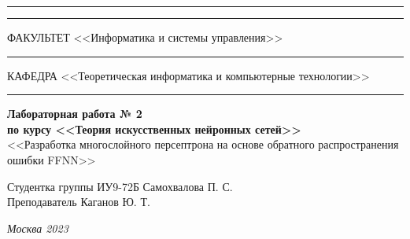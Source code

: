 \documentclass[a4paper, 14pt]{extarticle}
\begin{document}
\begin{titlepage}
\vspace{-25pt}
\hspace{-35pt}\rule{\textwidth}{2.3pt}

\vspace*{-20.3pt}
\hspace{-35pt}\rule{\textwidth}{0.4pt}

\vspace{1.5ex}
\hspace{-35pt} \noindent \small ФАКУЛЬТЕТ\hspace{80pt} <<Информатика и системы управления>>

\vspace*{-16pt}
\hspace{47pt}\rule{0.83\textwidth}{0.4pt}

\vspace{0.5ex}
\hspace{-35pt} \noindent \small КАФЕДРА\hspace{50pt} <<Теоретическая информатика и компьютерные технологии>>

\vspace*{-16pt}
\hspace{30pt}\rule{0.866\textwidth}{0.4pt}
  
\vspace{11em}

\begin{center}
\Large {\bf Лабораторная работа № 2} \\
\large {\bf по курсу <<Теория искусственных нейронных сетей>>} \\
\large <<Разработка многослойного персептрона на основе обратного распространения ошибки FFNN>>
\end{center}\normalsize

\vspace{8em}


\begin{flushright}
  {Студентка группы ИУ9-72Б Самохвалова П. С. \hspace*{15pt}\\
  \vspace{2ex}
  Преподаватель Каганов Ю. Т.\hspace*{15pt}}
\end{flushright}

\bigskip

\vfill
 

\begin{center}
\textsl{Москва 2023}
\end{center}
\end{titlepage}
\end{document}
